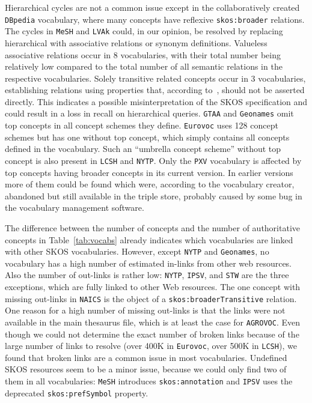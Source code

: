 Hierarchical cycles are not a common issue except in the collaboratively created \texttt{DBpedia} vocabulary, where many concepts have reflexive \texttt{skos:broader} relations. The cycles in \texttt{MeSH} and \texttt{LVAk} could, in our opinion, be resolved by replacing hierarchical with associative relations or synonym definitions.
Valueless associative relations occur in 8 vocabularies, with their total number being relatively low compared to the total number of all semantic relations in the respective vocabularies.
Solely transitive related concepts occur in 3 vocabularies, establishing relations using properties that, according to~\cite{SkosReference2008}, should not be asserted directly. This indicates a possible misinterpretation of the SKOS specification and could result in a loss in recall on hierarchical queries.
\texttt{GTAA} and \texttt{Geonames} omit top concepts in all concept schemes they define. \texttt{Eurovoc} uses 128 concept schemes but has one without top concept, which simply contains all concepts defined in the vocabulary. Such an ``umbrella concept scheme'' without top concept is also present in \texttt{LCSH} and \texttt{NYTP}.
Only the \texttt{PXV} vocabulary is affected by top concepts having broader concepts in its current version. In earlier versions more of them could be found which were, according to the vocabulary creator, abandoned but still available in the triple store, probably caused by some bug in the vocabulary management software.


The difference between the number of concepts and the number of authoritative concepts in Table~\ref{tab:vocabs} already indicates which vocabularies are linked with other SKOS vocabularies.
However, except \texttt{NYTP} and \texttt{Geonames}, no vocabulary has a high number of estimated in-links from other web resources.
Also the number of out-links is rather low: \texttt{NYTP}, \texttt{IPSV}, and \texttt{STW} are the three exceptions, which are fully linked to other Web resources. The one concept with missing out-links in \texttt{NAICS} is the object of a \texttt{skos:broaderTransitive} relation. One reason for a high number of missing out-links is that the links were not available in the main thesaurus file, which is at least the case for \texttt{AGROVOC}.
Even though we could not determine the exact number of broken links because of the large number of links to resolve  (over 400K in \texttt{Eurovoc}, over 500K in \texttt{LCSH}), we found that broken links are a common issue in most vocabularies.
Undefined SKOS resources seem to be a minor issue, because we could only find two of them in all vocabularies: \texttt{MeSH} introduces \texttt{skos:annotation} and \texttt{IPSV} uses the deprecated \texttt{skos:prefSymbol} property.
